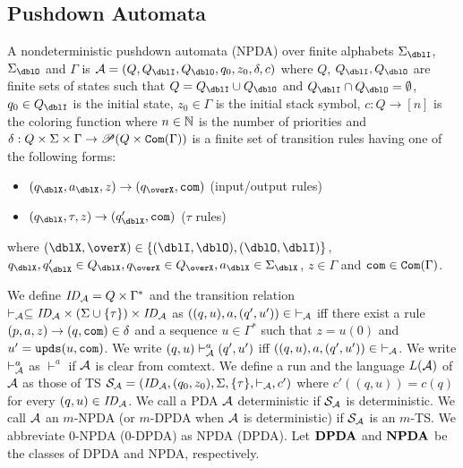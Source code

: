 \subsection{Pushdown Automata}

\begin{definition}
A nondeterministic {pushdown automata} (NPDA) over finite alphabets $\Sigma_\dblI$, $\Sigma_\dblO$ and $\Gamma$ is $\calA = (Q, Q_\dblI, Q_\dblO, q_0, z_0, \delta, c)$ where
$Q$, $Q_\dblI, Q_\dblO$ are finite sets of states such that $Q=Q_\dblI\cup Q_\dblO$ and $Q_\dblI \cap Q_\dblO = \emptyset$,
$q_0\in Q_\dblI$ is the initial state,
$z_0\in \Gamma$ is the initial stack symbol,
$c: Q \to [n]$ is the coloring function where $n\in \mathbb{N}$ is the number of priorities and
$\delta: Q \times \Sigma \times \Gamma \to \mathscr{P}(Q \times \mathtt{Com}(\Gamma))$ is a finite set of transition rules having one of the following forms:
\begin{itemize}
\item $(q_\dblX, a_\dblX, z) \rightarrow (q_\overX, \com)$ (input/output rules)
\item $(q_\dblX, \tau, z)\to(q'_\dblX,\com)$ ($\tau$ rules)
\end{itemize}
where $(\dblX, \overX)\in\{(\dblI, \dblO), (\dblO,\dblI)\}$,
$q_\dblX, q'_\dblX\in Q_\dblX, q_\overX\in Q_\overX, a_\dblX\in \Sigma_\dblX$, $z\in \Gamma$ and $\mathtt{com}\in \mathtt{Com}(\Gamma)$.
\end{definition}
We define $\mathit{ID}_{\cal A}= Q\times \Gamma^*$ and
the transition relation $\vdash_{\cal A}\subseteq \mathit{ID}_{\cal A}\times (\Sigma\cup\{\tau\})\times \mathit{ID}_{\cal A}$ as
$((q,u),a,(q',u'))\in\ \vdash_{\cal A}$ iff there exist a rule $(p, a, z) \rightarrow (q, \mathtt{com}) \in \delta$ and a sequence $u\in \Gamma^*$ such that $z=u(0)$ and $u'=\mathtt{upds}(u,\mathtt{com})$.
We write $(q,u)\vdash^a_{\cal A}(q',u')$ iff
$((q,u),a,(q',u'))\in\ \vdash_{\cal A}$.
We write $\vdash^{a}_{\cal A}$ as $\vdash^{a}$ if ${\cal A}$ is clear from comtext.
We define a run and the language $L({\cal A})$ of ${\cal A}$ as those of TS ${\cal S}_{\cal A}=(\mathit{ID}_{\cal A}, (q_0,z_0),\Sigma, \{\tau\},\vdash_{\cal A},c')$
where $c'((q,u))= c(q)$ for every $(q,u)\in\mathit{ID}_{\cal A}$.
We call a PDA ${\cal A}$ deterministic if ${\cal S}_{\cal A}$ is deterministic.
We call ${\cal A}$ an $m$-NPDA (or $m$-DPDA when ${\cal A}$ is deterministic)
if ${\cal S}_{\cal A}$ is an $m$-TS.
We abbreviate $0$-NPDA ($0$-DPDA) as NPDA (DPDA).
Let ${\bf DPDA}$ and ${\bf NPDA}$ be the classes of DPDA and NPDA, respectively.


